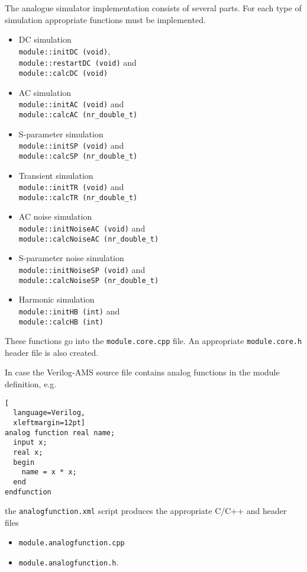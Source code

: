 
The analogue simulator implementation consists of several parts.  For
each type of simulation appropriate functions must be implemented.
\begin{itemize}
\item DC simulation\\
\verb+module::initDC (void)+,\\
\verb+module::restartDC (void)+ and\\
\verb+module::calcDC (void)+
\item AC simulation\\
\verb+module::initAC (void)+ and\\
\verb+module::calcAC (nr_double_t)+
\item S-parameter simulation\\
\verb+module::initSP (void)+ and\\
\verb+module::calcSP (nr_double_t)+
\item Transient simulation\\
\verb+module::initTR (void)+ and\\
\verb+module::calcTR (nr_double_t)+
\item AC noise simulation\\
\verb+module::initNoiseAC (void)+ and\\
\verb+module::calcNoiseAC (nr_double_t)+
\item S-parameter noise simulation\\
\verb+module::initNoiseSP (void)+ and\\
\verb+module::calcNoiseSP (nr_double_t)+
\item Harmonic simulation\\
\verb+module::initHB (int)+ and\\
\verb+module::calcHB (int)+
\end{itemize}

These functions go into the \verb+module.core.cpp+ file.  An
appropriate \verb+module.core.h+ header file is also created.

\addvspace{12pt}

In case the Verilog-AMS source file contains analog functions in the
module definition, e.g.
\begin{lstlisting}[
  language=Verilog,
  xleftmargin=12pt]
analog function real name;
  input x;
  real x;
  begin
    name = x * x;
  end
endfunction
\end{lstlisting}

the \verb+analogfunction.xml+ script produces the appropriate C/C++
and header files
\begin{itemize}
\item \verb+module.analogfunction.cpp+
\item \verb+module.analogfunction.h+.
\end{itemize}


